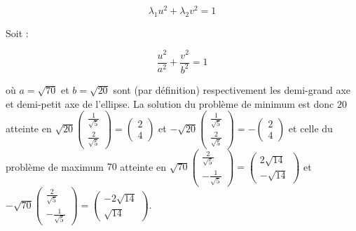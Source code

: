 \documentclass{report}
\begin{document}
\[ \lambda_1 u^2 + \lambda_2 v^2 = 1 \]

Soit :

\[ \frac{u^2}{a^2} + \frac{v^2}{b^2} = 1 \] 

où $a = \sqrt{70}$ et $b = \sqrt{20}$ sont (par définition) respectivement les demi-grand axe et demi-petit axe de l'ellipse. La solution du problème de minimum est donc $20$ atteinte en $\sqrt{20} \begin{pmatrix} \frac{1}{\sqrt{5}} \\ \frac{2}{\sqrt{5}} \end{pmatrix} = \begin{pmatrix} 2 \\ 4 \end{pmatrix}$ et $-\sqrt{20}\begin{pmatrix} \frac{1}{\sqrt{5}} \\ \frac{2}{\sqrt{5}}  \end{pmatrix} = -\begin{pmatrix} 2 \\ 4 \end{pmatrix} $ et celle du problème de maximum $70$ atteinte en $\sqrt{70}\begin{pmatrix} \frac{2}{\sqrt{5}} \\ -\frac{1}{\sqrt{5}} \end{pmatrix} = \begin{pmatrix} 2\sqrt{14} \\ -\sqrt{14} \end{pmatrix}$ et $-\sqrt{70} \begin{pmatrix} \frac{2}{\sqrt{5}} \\ -\frac{1}{\sqrt{5}} \end{pmatrix} = \begin{pmatrix} -2\sqrt{14} \\ \sqrt{14} \end{pmatrix}$.
\end{document}
